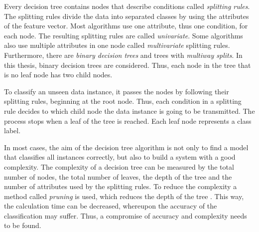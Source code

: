 Every decision tree contains nodes that describe conditions called \textit{splitting rules}. The splitting rules divide the data into separated classes by using the attributes of the feature vector. Most algorithms use one attribute, thus one condition, for each node. The resulting splitting rules are called \textit{univariate}. Some algorithms also use multiple attributes in one node called \textit{multivariate} splitting rules. Furthermore, there are \textit{binary decision trees} and trees with \textit{multiway splits}. In this thesis, binary decision trees are considered. Thus, each node in the tree that is no leaf node has two child nodes.

To classify an unseen data instance, it passes the nodes by following their splitting rules, beginning at the root node. Thus, each condition in a splitting rule decides to which child node the data instance is going to be transmitted. The process stops when a leaf of the tree is reached. Each leaf node represents a class label.

In most cases, the aim of the decision tree algorithm is not only to find a model that classifies all instances correctly, but also to build a system with a good complexity. The complexity of a decision tree can be measured by the total number of nodes, the total number of leaves, the depth of the tree and the number of attributes used by the splitting rules. To reduce the complexity a method called \textit{pruning} is used, which reduces the depth of the tree \autocite{Bhargava:2013}. This way, the calculation time can be decreased, whereupon the accuracy of the classification may suffer. Thus, a compromise of accuracy and complexity needs to be found.


